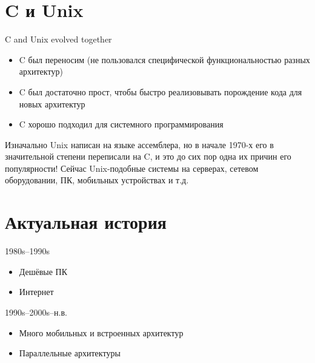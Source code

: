 \documentclass[xetex,aspectratio=169]{beamer}
\begin{document}
\section{C и Unix}

\begin{frame}{C and Unix evolved together}
	\begin{itemize}
		\item C был переносим (не пользовался специфической функциональностью разных архитектур)
		\item C был достаточно прост, чтобы быстро реализовывать порождение кода для новых архитектур
		\item C хорошо подходил для системного программирования
	\end{itemize}

	\pause
    Изначально Unix написан на языке ассемблера, но в начале 1970-х его в значительной степени переписали на C, и это до сих пор одна их причин его популярности! Сейчас Unix-подобные системы на серверах, сетевом оборудовании, ПК, мобильных устройствах и т.д.
\end{frame}

\section{Актуальная история}

\begin{frame}{1980s--1990s}
	\begin{itemize}
	\item Дешёвые ПК
	\item Интернет
	\end{itemize}
\end{frame}

\begin{frame}{1990s--2000s--н.в.}
	\begin{itemize}
		\item Много мобильных и встроенных архитектур
		\item Параллельные архитектуры
	\end{itemize}
\end{frame}

\postamble
\end{document}
